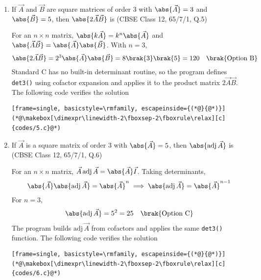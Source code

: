 \begin{enumerate}[label=\thesubsection.\arabic*, ref=\thesubsection.\theenumi]
\solution
(theory only) A matrix is symmetric if $\vec{A}^{\top} = \vec{A}$. For a diagonal matrix the transpose leaves every entry unchanged,
\begin{align}
	\vec{A}^{\top} = \myvec{3 & 0 & 0 \\ 0 & 2 & 0 \\ 0 & 0 & 5} = \vec{A}
\end{align}
The diagonal entries are not all equal, so $\vec{A}$ is not a scalar matrix; it is neither the identity nor the null matrix. Hence $\vec{A}$ is a symmetric matrix $\brak{\text{Option D}}$.

\item
If $\vec{A}$ and $\vec{B}$ are square matrices of order $3$ with $\abs{\vec{A}} = 3$ and $\abs{\vec{B}} = 5$, then $\abs{2\vec{A}\vec{B}}$ is
\hfill (CBSE Class 12, 65/7/1, Q.5)

\solution
For an $n \times n$ matrix, $\abs{k\vec{A}} = k^n\abs{\vec{A}}$ and $\abs{\vec{A}\vec{B}} = \abs{\vec{A}}\abs{\vec{B}}$. With $n = 3$,
\begin{align}
	\abs{2\vec{A}\vec{B}} = 2^3\abs{\vec{A}}\abs{\vec{B}} = 8\brak{3}\brak{5} = 120 \quad \brak{\text{Option B}}
\end{align}
Standard C has no built-in determinant routine, so the program defines \texttt{det3()} using cofactor expansion and applies it to the product matrix $2\vec{A}\vec{B}$. The following code verifies the solution
\begin{lstlisting}[frame=single, basicstyle=\rmfamily, escapeinside={(*@}{@*)}]
(*@\makebox[\dimexpr\linewidth-2\fboxsep-2\fboxrule\relax][c]{codes/5.c}@*)
\end{lstlisting}

\item
If $\vec{A}$ is a square matrix of order $3$ with $\abs{\vec{A}} = 5$, then $\abs{\text{adj}\,\vec{A}}$ is
\hfill (CBSE Class 12, 65/7/1, Q.6)

\solution
For an $n\times n$ matrix, $\vec{A}\,\text{adj}\,\vec{A} = \abs{\vec{A}}\vec{I}$. Taking determinants,
\begin{align}
	\abs{\vec{A}}\abs{\text{adj}\,\vec{A}} = \abs{\vec{A}}^n \implies \abs{\text{adj}\,\vec{A}} = \abs{\vec{A}}^{n-1}
\end{align}
For $n = 3$,
\begin{align}
	\abs{\text{adj}\,\vec{A}} = 5^2 = 25 \quad \brak{\text{Option C}}
\end{align}
The program builds $\text{adj}\,\vec{A}$ from cofactors and applies the same \texttt{det3()} function. The following code verifies the solution
\begin{lstlisting}[frame=single, basicstyle=\rmfamily, escapeinside={(*@}{@*)}]
(*@\makebox[\dimexpr\linewidth-2\fboxsep-2\fboxrule\relax][c]{codes/6.c}@*)
\end{lstlisting}


\end{enumerate}
